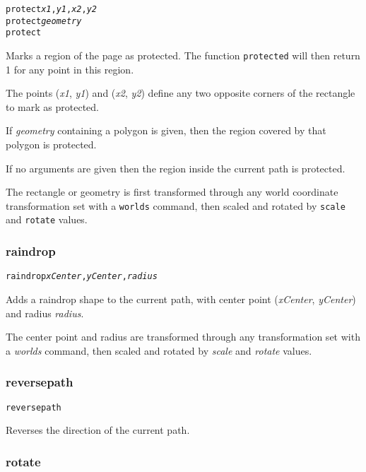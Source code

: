 \begin{alltt}
protect \textit{x1}, \textit{y1}, \textit{x2}, \textit{y2}
protect \textit{geometry}
protect
\end{alltt}

Marks a region of the page as protected.
The function \texttt{protected} will then return 1 for any
point in this region.

The points
(\textit{x1}, \textit{y1}) and (\textit{x2}, \textit{y2}) define
any two opposite corners of the rectangle to mark as protected.

If \textit{geometry} containing a polygon is given, then the region
covered by that polygon is protected.

If no arguments are given then the region inside the current path is
protected.

The rectangle or geometry
is first transformed through any world coordinate
transformation set with a \texttt{worlds} command,
then scaled and rotated by \texttt{scale}
and \texttt{rotate} values.

\subsubsection{raindrop}

\begin{alltt}
raindrop \textit{xCenter}, \textit{yCenter}, \textit{radius}
\end{alltt}

Adds a raindrop shape to the current path, with center
point (\textit{xCenter}, \textit{yCenter}) and radius
\textit{radius}.

The center point and radius are transformed through any
transformation set with a \textit{worlds} command,
then scaled and rotated by \textit{scale}
and \textit{rotate} values.

\subsubsection{reversepath}

\begin{alltt}
reversepath
\end{alltt}

Reverses the direction of the current path.

\subsubsection{rotate}

